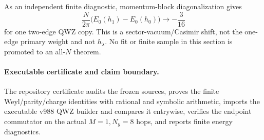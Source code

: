 As an independent finite diagnostic, momentum-block diagonalization gives
\[
 \frac{N}{2\pi}\bigl(E_0(h_1)-E_0(h_0)\bigr)\longrightarrow-\frac3{16}
\tag{4.4}
\]
for one two-edge QWZ copy.  This is a sector-vacuum/Casimir shift, not the
one-edge primary weight and not $h_\lambda$.  No fit or finite sample in this
section is promoted to an all-$N$ theorem.

\paragraph{Executable certificate and claim boundary.}

The repository certificate 
audits the frozen sources, proves the finite Weyl/parity/charge identities
with rational and symbolic arithmetic, imports the executable v988 QWZ
builder and compares it entrywise, verifies the endpoint commutator on the
actual $M=1,N_y=8$ hops, and reports finite energy diagnostics.

\begin{center}
\end{center}
\endgroup
